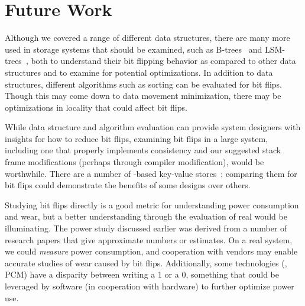 
\section{Future Work}
\label{sec:fw}

Although we covered a range of different data structures, there are many more
used in storage systems that should be examined, such as
B-trees~\cite{btree} and
LSM-trees~\cite{lsmtree}, both to understand their bit flipping behavior as compared to
other data structures and to examine for potential optimizations. In
addition to data structures, different algorithms such as sorting can be
evaluated for bit flips. Though this may come
down to data movement minimization, there may be optimizations in locality that
could affect bit flips.

While data structure and algorithm evaluation can provide system designers with
insights for how to reduce bit flips, examining bit flips in a large system,
including one that properly implements consistency and our suggested stack frame modifications
(perhaps through compiler modification),
would be worthwhile.
There are a number of \NVM-based key-value stores~\cite{kv1}; comparing them
for bit flips could demonstrate the benefits of some designs
over others.

Studying bit flips directly is a good metric for understanding
power consumption and wear, but a better understanding through the evaluation of
real \NVM would be illuminating. The power study discussed earlier was
derived from a number of research papers that give approximate numbers or
estimates. On a real system, we could \textit{measure} power
consumption, and cooperation with vendors may enable accurate studies of
wear caused by bit flips. Additionally, some technologies (\eg, PCM) have a disparity between writing
a 1 or a 0, something that could be leveraged by software (in cooperation with hardware) to
further optimize power use.

